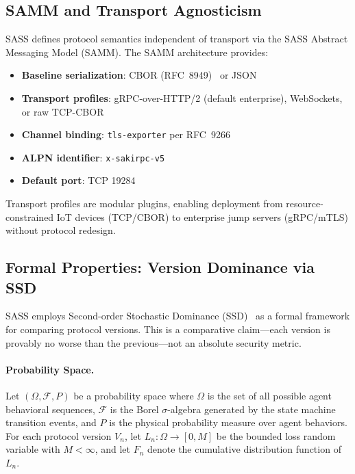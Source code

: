 \documentclass[sigconf,anonymous]{acmart}
\begin{document}
\subsection{SAMM and Transport Agnosticism}

SASS defines protocol semantics independent of transport via the SASS Abstract Messaging Model (SAMM). The SAMM architecture provides:

\begin{itemize}
\item \textbf{Baseline serialization}: CBOR (RFC~8949)~\cite{rfc8949} or JSON
\item \textbf{Transport profiles}: gRPC-over-HTTP/2 (default enterprise), WebSockets, or raw TCP-CBOR
\item \textbf{Channel binding}: \texttt{tls-exporter} per RFC~9266~\cite{rfc9266}
\item \textbf{ALPN identifier}: \texttt{x-sakirpc-v5}
\item \textbf{Default port}: TCP 19284
\end{itemize}

Transport profiles are modular plugins, enabling deployment from resource-constrained IoT devices (TCP/CBOR) to enterprise jump servers (gRPC/mTLS) without protocol redesign.

\subsection{Formal Properties: Version Dominance via SSD}

SASS employs Second-order Stochastic Dominance (SSD)~\cite{rothschild1970increasing, hadar1969rules} as a formal framework for comparing protocol versions. This is a comparative claim---each version is provably no worse than the previous---not an absolute security metric.

\paragraph{Probability Space.}
Let $(\Omega, \mathcal{F}, P)$ be a probability space where $\Omega$ is the set of all possible agent behavioral sequences, $\mathcal{F}$ is the Borel $\sigma$-algebra generated by the state machine transition events, and $P$ is the physical probability measure over agent behaviors. For each protocol version $V_n$, let $L_n : \Omega \to [0, M]$ be the bounded loss random variable with $M < \infty$, and let $F_n$ denote the cumulative distribution function of $L_n$.
\end{document}

